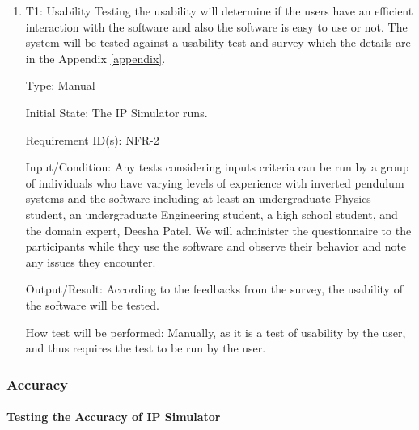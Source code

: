 \documentclass[12pt, titlepage]{article}
\begin{document}
\begin{enumerate}

\item{T1: Usability}
\vspace{3mm}
\newline
Testing the usability will determine if the users have an efficient interaction with the software and also the software is easy to use or not. The system will be tested against a usability test and survey which the details are in the Appendix \ref{appendix}.

Type: Manual
					
Initial State: The IP Simulator runs. 

Requirement ID(s): NFR-2			

Input/Condition: Any tests considering inputs criteria can be run by a group of individuals who have varying levels of experience with inverted pendulum systems and the software including at least an undergraduate Physics student, an undergraduate Engineering student, a high school student, and the domain expert, Deesha Patel.
We will administer the questionnaire to the participants while they use the software and observe their behavior and note any issues they encounter.

Output/Result: According to the feedbacks from the survey, the usability of the software will be tested.

How test will be performed: Manually, as it is a test of usability by the user, and thus requires the test to be run by the user.

\end{enumerate}				

\subsubsection{Accuracy\label{nfr3}}

\paragraph{Testing the Accuracy of IP Simulator}
\end{document}
